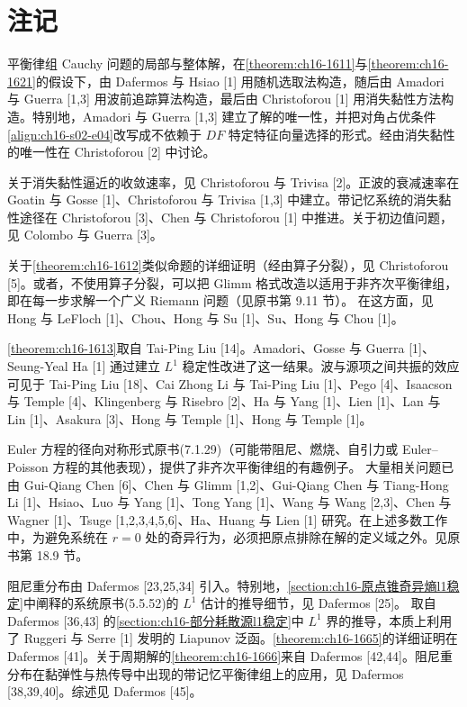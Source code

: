 \documentclass[../../main.tex]{subfiles}
\begin{document}
\section{注记}\label{section:ch16-注记}

平衡律组 Cauchy 问题的局部与整体解，在\cref{theorem:ch16-1611}与\cref{theorem:ch16-1621}的假设下，由 Dafermos 与 Hsiao [1] 用随机选取法构造，随后由 Amadori 与 Guerra [1,3] 用波前追踪算法构造，最后由 Christoforou [1] 用消失黏性方法构造。特别地，Amadori 与 Guerra [1,3] 建立了解的唯一性，并把对角占优条件\eqref{align:ch16-s02-e04}改写成不依赖于 $DF$ 特定特征向量选择的形式。经由消失黏性的唯一性在 Christoforou [2] 中讨论。

关于消失黏性逼近的收敛速率，见 Christoforou 与 Trivisa [2]。正波的衰减速率在 Goatin 与 Gosse [1]、Christoforou 与 Trivisa [1,3] 中建立。带记忆系统的消失黏性途径在 Christoforou [3]、Chen 与 Christoforou [1] 中推进。关于初边值问题，见 Colombo 与 Guerra [3]。

关于\cref{theorem:ch16-1612}类似命题的详细证明（经由算子分裂），见 Christoforou [5]。或者，不使用算子分裂，可以把 Glimm 格式改造以适用于非齐次平衡律组，即在每一步求解一个广义 Riemann 问题（见原书第 9.11 节）。
在这方面，见 Hong 与 LeFloch [1]、Chou、Hong 与 Su [1]、Su、Hong 与 Chou [1]。

\cref{theorem:ch16-1613}取自 Tai-Ping Liu [14]。Amadori、Gosse 与 Guerra [1]、Seung-Yeal Ha [1] 通过建立 $L^1$ 稳定性改进了这一结果。波与源项之间共振的效应可见于 Tai-Ping Liu [18]、Cai Zhong Li 与 Tai-Ping Liu [1]、Pego [4]、Isaacson 与 Temple [4]、Klingenberg 与 Risebro [2]、Ha 与 Yang [1]、Lien [1]、Lan 与 Lin [1]、Asakura [3]、Hong 与 Temple [1]、Hong 与 Temple [1]。

Euler 方程的径向对称形式原书(7.1.29)（可能带阻尼、燃烧、自引力或 Euler--Poisson 方程的其他表现），提供了非齐次平衡律组的有趣例子。
大量相关问题已由 Gui-Qiang Chen [6]、Chen 与 Glimm [1,2]、Gui-Qiang Chen 与 Tiang-Hong Li [1]、Hsiao、Luo 与 Yang [1]、Tong Yang [1]、Wang 与 Wang [2,3]、Chen 与 Wagner [1]、Tsuge [1,2,3,4,5,6]、Ha、Huang 与 Lien [1] 研究。在上述多数工作中，为避免系统在 $r=0$ 处的奇异行为，必须把原点排除在解的定义域之外。见原书第 18.9 节。

阻尼重分布由 Dafermos [23,25,34] 引入。特别地，\cref{section:ch16-原点锥奇异熵l1稳定}中阐释的系统原书(5.5.52)的 $L^1$ 估计的推导细节，见 Dafermos [25]。
取自 Dafermos [36,43] 的\cref{section:ch16-部分耗散源l1稳定}中 $L^1$ 界的推导，本质上利用了 Ruggeri 与 Serre [1] 发明的 Liapunov 泛函。\cref{theorem:ch16-1665}的详细证明在 Dafermos [41]。关于周期解的\cref{theorem:ch16-1666}来自 Dafermos [42,44]。阻尼重分布在黏弹性与热传导中出现的带记忆平衡律组上的应用，见 Dafermos [38,39,40]。综述见 Dafermos [45]。
\end{document}
